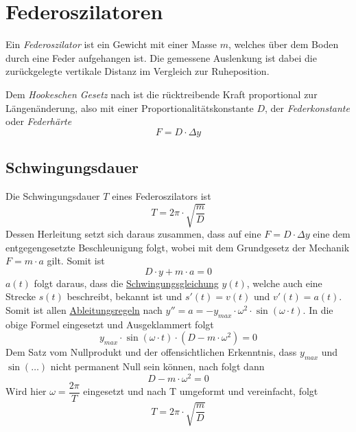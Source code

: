 \documentclass{article}
\begin{document}
 
\section{Federoszilatoren}
\begin{minipage}{\dimexpr\linewidth-4.5cm} 
 Ein \emph{Federoszilator} ist ein Gewicht mit einer Masse $m$, welches über dem Boden durch eine Feder aufgehangen ist. Die gemessene Auslenkung ist dabei die zurückgelegte vertikale Distanz im Vergleich zur Ruheposition. 
 
 Dem \emph{Hookeschen Gesetz} nach ist die rücktreibende Kraft proportional zur Längenänderung, also mit einer Proportionalitätskonstante $D$, der \emph{Federkonstante} oder \emph{Federhärte}
\[
 F = D \cdot \Delta y 
\] 
\end{minipage}
\hfill
\begin{minipage}{4.5cm}
 \center
\end{minipage} 
 
\subsection{Schwingungsdauer} 
Die Schwingungsdauer $T$ eines Federoszilators ist
\[
 T = 2\pi \cdot \sqrt{\frac{m}{D}} 
\]
Dessen Herleitung setzt sich daraus zusammen, dass auf eine $F=D \cdot \Delta y$ eine dem entgegengesetzte Beschleunigung folgt, wobei mit dem Grundgesetz der Mechanik $F=m \cdot a$ gilt. Somit ist
\[
D \cdot y + m \cdot a = 0 
\] 
$a(t)$ folgt daraus, dass die \hyperref[Mechanische Schwingungen]{Schwingungsgleichung} $y(t)$, welche auch eine Strecke $s(t)$ beschreibt, bekannt ist und $s'(t) = v(t)$ und $v'(t) = a(t)$. Somit ist allen \hyperref[Ableitungen]{Ableitungsregeln} nach $y''=a{= -y_{max} \cdot \omega^2 \cdot \sin{(\omega \cdot t)}}$. In die obige Formel eingesetzt und Ausgeklammert folgt
\[ 
 y_{max} \cdot \sin{(\omega \cdot t)} \cdot (D-m \cdot \omega^2) = 0 
\] 
Dem Satz vom Nullprodukt und der offensichtlichen Erkenntnis, dass $y_{max}$ und $\sin{(\ldots)}$ nicht permanent Null sein können, nach folgt dann
\[ 
 D-m \cdot \omega^2 = 0
\]
Wird hier $\omega = \dfrac{2\pi}{T}$ eingesetzt und nach T umgeformt und vereinfacht, folgt
\[
 \boxed{
  T = 2\pi \cdot \sqrt{\frac{m}{D}} 
 } 
\] 
\end{document}
